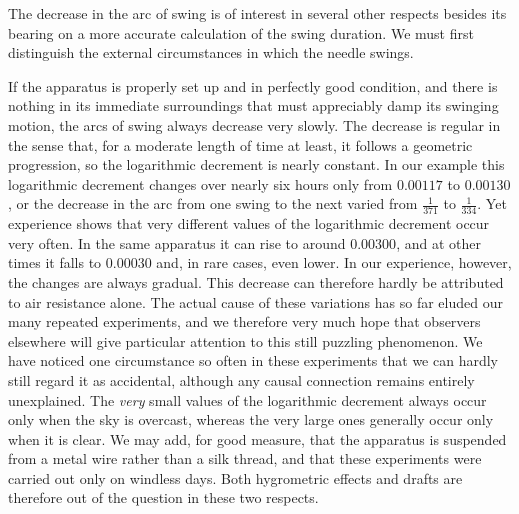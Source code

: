 The decrease in the arc of swing is of interest in several other respects besides its bearing on a more accurate calculation of the swing duration. We must first distinguish the external circumstances in which the needle swings.

If the apparatus is properly set up and in perfectly good condition, and there is nothing in its immediate surroundings that must appreciably damp its swinging motion, the arcs of swing always decrease very slowly. The decrease is regular in the sense that, for a moderate length of time at least, it follows a geometric progression, so the logarithmic decrement is nearly constant. In our example this logarithmic decrement changes over nearly six hours only from $0.00117$ to $0.00130$, or the decrease in the arc from one swing to the next varied from $\tfrac1{371}$ to $\tfrac1{334}$. Yet experience shows that very different values of the logarithmic decrement occur very often. In the same apparatus it can rise to around $0.00300$, and at other times it falls to $0.00030$ and, in rare cases, even lower. In our experience, however, the changes are always gradual. This decrease can therefore hardly be attributed to air resistance alone. The actual cause of these variations has so far eluded our many repeated experiments, and we therefore very much hope that observers elsewhere will give particular attention to this still puzzling phenomenon. We have noticed one circumstance so often in these experiments that we can hardly still regard it as accidental, although any causal connection remains entirely unexplained. The \textit{very} small values of the logarithmic decrement always occur only when the sky is overcast, whereas the very large ones generally occur only when it is clear. We may add, for good measure, that the apparatus is suspended from a metal wire rather than a silk thread, and that these experiments were carried out only on windless days. Both hygrometric effects and drafts are therefore out of the question in these two respects.

